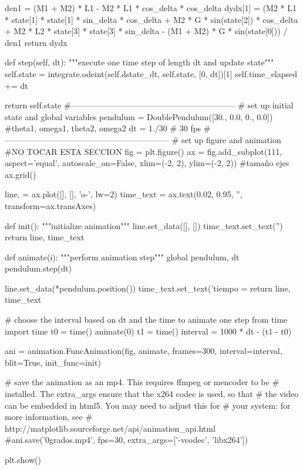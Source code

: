 \documentclass[12pt]{article}
\begin{document}
\begin{boxedverbatim}

        den1 = (M1 + M2) * L1 - M2 * L1 * cos_delta * cos_delta
        dydx[1] = (M2 * L1 * state[1] * state[1] * sin_delta * cos_delta
                   + M2 * G * sin(state[2]) * cos_delta
                   + M2 * L2 * state[3] * state[3] * sin_delta
                   - (M1 + M2) * G * sin(state[0])) / den1
        return dydx

   
def step(self, dt):
    """execute one time step of length dt and update state"""
        self.state = integrate.odeint(self.dstate_dt, 
        self.state, [0, dt])[1]
        self.time_elapsed += dt
        
        return self.state
#------------------------------------------------------------
# set up initial state and global variables
pendulum = DoublePendulum([30., 0.0, 0., 0.0]) 
#theta1, omega1, theta2, omega2
dt = 1./30 # 30 fps
#------------------------------------------------------------
# set up figure and animation
#NO TOCAR ESTA SECCION
fig = plt.figure()
ax = fig.add_subplot(111, aspect='equal', autoscale_on=False,
                     xlim=(-2, 2), ylim=(-2, 2)) #tamaño ejes
ax.grid()

line, = ax.plot([], [], 'o-', lw=2)
time_text = ax.text(0.02, 0.95, '', transform=ax.transAxes)

def init():
    """initialize animation"""
    line.set_data([], [])
    time_text.set_text('')
    return line, time_text

def animate(i):
    """perform animation step"""
    global pendulum, dt
    pendulum.step(dt)
    
    line.set_data(*pendulum.position())
    time_text.set_text('tiempo = %
    return line, time_text
\end{boxedverbatim}
\pagebreak

\begin{boxedverbatim}

# choose the interval based on dt and the time to animate one step
from time import time
t0 = time()
animate(0)
t1 = time()
interval = 1000 * dt - (t1 - t0)

ani = animation.FuncAnimation(fig, animate, frames=300,
                              interval=interval, blit=True, init_func=init)

# save the animation as an mp4.  This requires ffmpeg or mencoder to be
# installed.  The extra_args ensure that the x264 codec is used, so that
# the video can be embedded in html5.  You may need to adjust this for
# your system: for more information, see
# http://matplotlib.sourceforge.net/api/animation_api.html
#ani.save('0grados.mp4', fps=30, extra_args=['-vcodec', 'libx264'])

plt.show()
\end{boxedverbatim}
\pagebreak
\end{document}
